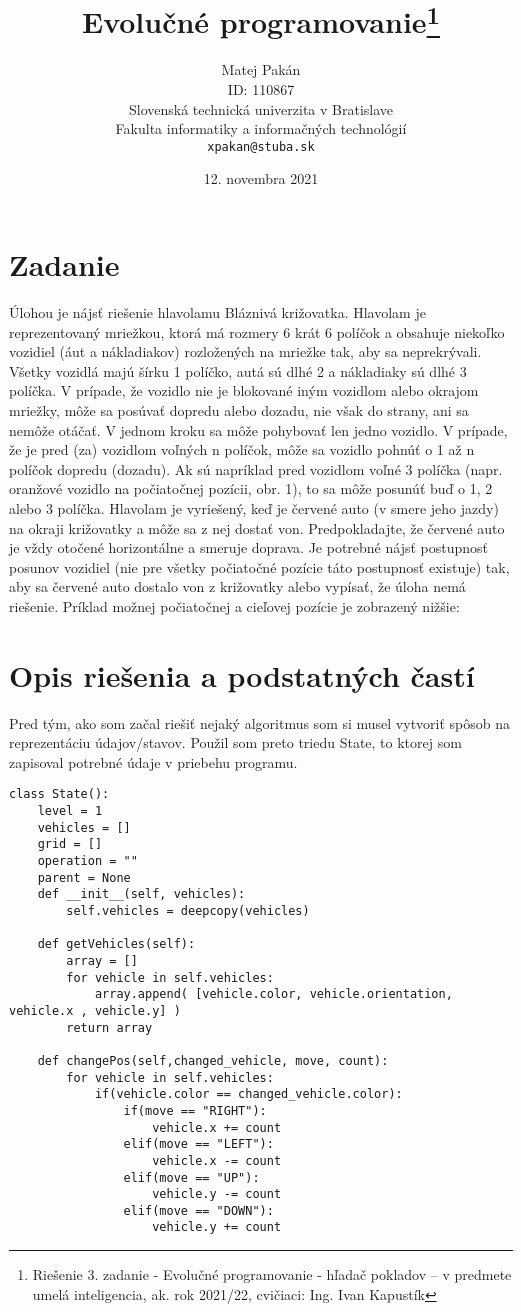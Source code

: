 \documentclass[10pt,oneside,slovak,a4paper]{article}
\title{Evolučné programovanie\thanks{Riešenie 3. zadanie - Evolučné programovanie - hľadač pokladov – v predmete umelá inteligencia, ak. rok 2021/22, cvičiaci: 
Ing. Ivan Kapustík}}
\author{Matej Pakán\\[2pt]
	{\small ID: 110867}\\
	{\small Slovenská technická univerzita v Bratislave}\\
	{\small Fakulta informatiky a informačných technológií}\\
	{\small \texttt{xpakan@stuba.sk}}
	}
\date{\small 12. novembra 2021}
\begin{document}
\maketitle
\newpage
\tableofcontents{\protect\newpage}

\section{Zadanie}

Úlohou je nájsť riešenie hlavolamu Bláznivá križovatka. Hlavolam je reprezentovaný mriežkou, ktorá má rozmery 6 krát 6 políčok a obsahuje niekoľko vozidiel (áut a nákladiakov) rozložených na mriežke tak, aby sa neprekrývali. Všetky vozidlá majú šírku 1 políčko, autá sú dlhé 2 a nákladiaky sú dlhé 3 políčka. V prípade, že vozidlo nie je blokované iným vozidlom alebo okrajom mriežky, môže sa posúvať dopredu alebo dozadu, nie však do strany, ani sa nemôže otáčať. V jednom kroku sa môže pohybovať len jedno vozidlo. V prípade, že je pred (za) vozidlom voľných n políčok, môže sa vozidlo pohnúť o 1 až n políčok dopredu (dozadu). Ak sú napríklad pred vozidlom voľné 3 políčka (napr. oranžové vozidlo na počiatočnej pozícii, obr. 1), to sa môže posunúť buď o 1, 2 alebo 3 políčka.
Hlavolam je vyriešený, keď je červené auto (v smere jeho jazdy) na okraji križovatky a môže sa z nej dostať von. Predpokladajte, že červené auto je vždy otočené horizontálne a smeruje doprava. Je potrebné nájsť postupnosť posunov vozidiel (nie pre všetky počiatočné pozície táto postupnosť existuje) tak, aby sa červené auto dostalo von z križovatky alebo vypísať, že úloha nemá riešenie. Príklad možnej počiatočnej a cieľovej pozície je zobrazený nižšie:


\section{Opis riešenia a podstatných častí}

Pred tým, ako som začal riešiť nejaký algoritmus som si musel vytvoriť spôsob na reprezentáciu údajov/stavov. Použil som preto triedu State, to ktorej som zapisoval potrebné údaje v priebehu programu.

\begin{lstlisting}
class State():
    level = 1
    vehicles = []
    grid = []
    operation = ""
    parent = None
    def __init__(self, vehicles):
        self.vehicles = deepcopy(vehicles)

    def getVehicles(self):
        array = []
        for vehicle in self.vehicles:
            array.append( [vehicle.color, vehicle.orientation, vehicle.x , vehicle.y] )
        return array

    def changePos(self,changed_vehicle, move, count):
        for vehicle in self.vehicles:
            if(vehicle.color == changed_vehicle.color):
                if(move == "RIGHT"):
                    vehicle.x += count
                elif(move == "LEFT"):
                    vehicle.x -= count
                elif(move == "UP"):
                    vehicle.y -= count
                elif(move == "DOWN"):
                    vehicle.y += count
\end{lstlisting}
\end{document}
